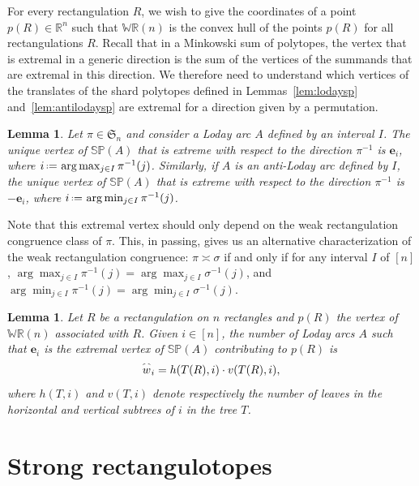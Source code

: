 \documentclass{amsart}
\newtheorem{lemma}[theorem]{Lemma}
\theoremstyle{definition}
\newcommand{\R}{\mathbb{R}} %
\newcommand{\f}[1]{\mathfrak{#1}} %
\newcommand{\eqdef}{\mbox{\,\raisebox{0.2ex}{\scriptsize\ensuremath{\mathrm:}}\ensuremath{=}\,}} %
\newcommand{\polytope}[1]{\mathds{#1}} %
\newcommand{\WRP}{\polytope{WR}} %
\newcommand{\SP}{\polytope{SP}}
\newcommand{\loday}[1]{\smash{\overset{\frown}{#1}}}
\newcommand{
\weakeq}{\asymp}
\begin{document}
For every rectangulation $R$, we wish to give the coordinates of a point $p(R)\in\R^n$ such that $\WRP(n)$ is the convex hull of the points $p(R)$ for all rectangulations $R$.
Recall that in a Minkowski sum of polytopes, the vertex that is extremal in a generic direction is the sum of the vertices of the summands that are extremal in this direction.
We therefore need to understand which vertices of the translates of the shard polytopes defined in Lemmas~\ref{lem:lodaysp} and~\ref{lem:antilodaysp} are extremal for a direction given by a permutation.

\begin{lemma}
  \label{lem:lodaymax}
  Let $\pi\in\f{S}_n$ and consider a Loday arc $A$ defined by an interval $I$.
  The unique vertex of $\SP(A)$ that is extreme with respect to the direction $\pi^{-1}$
  is $\mathbf{e}_i$, where $i \eqdef \arg\max_{j\in I} \pi^{-1}(j)$.
  Similarly, if $A$ is an anti-Loday arc defined by $I$, the unique vertex of $\SP(A)$ that is extreme with respect to the direction $\pi^{-1}$
  is $-\mathbf{e}_i$, where $i \eqdef \arg\min_{j\in I} \pi^{-1}(j)$.
\end{lemma}

Note that this extremal vertex should only depend on the weak rectangulation congruence class of $\pi$.
This, in passing, gives us an alternative characterization of the weak rectangulation congruence:
$\pi
\weakeq\sigma$ if and only if for any interval $I$ of $[n]$,
$\arg\max_{j\in I} \pi^{-1}(j)=\arg\max_{j\in I} \sigma^{-1}(j)$, and
$\arg\min_{j\in I} \pi^{-1}(j)=\arg\min_{j\in I} \sigma^{-1}(j)$.

\begin{lemma}
  Let $R$ be a rectangulation on $n$ rectangles and $p(R)$ the vertex of $\WRP(n)$ associated with $R$.
  Given $i\in [n]$, the number of Loday arcs $A$ such that $\mathbf{e}_i$ is the extremal vertex of $\SP(A)$ contributing to $p(R)$ is
  \[
  \loday{w}_i =  h(T(R), i)\cdot v(T(R),i),
  \]
   where $h(T,i)$ and $v(T,i)$ denote respectively the number of leaves in the horizontal and vertical subtrees of $i$ in the tree $T$.
\end{lemma}


\section{Strong rectangulotopes}
\label{sec:sr}
\end{document}
